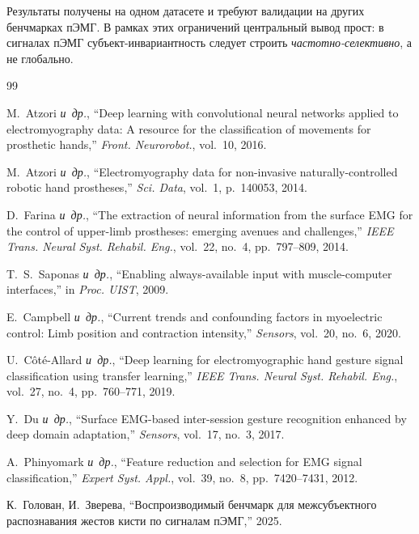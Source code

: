 \documentclass[conference]{IEEEtran}
\newcommand{\etal}{\mbox{\textit{и~др.}}}
\begin{document}
Результаты получены на одном датасете и требуют валидации на других бенчмарках пЭМГ.
В рамках этих ограничений центральный вывод прост: в сигналах пЭМГ субъект-инвариантность следует строить \emph{частотно-селективно}, а не глобально.


\begin{thebibliography}{99}

M.~Atzori \etal, ``Deep learning with convolutional neural networks applied to electromyography data: A resource for the classification of movements for prosthetic hands,'' \textit{Front. Neurorobot.}, vol.~10, 2016.

M.~Atzori \etal, ``Electromyography data for non-invasive naturally-controlled robotic hand prostheses,'' \textit{Sci. Data}, vol.~1, p.~140053, 2014.

D.~Farina \etal, ``The extraction of neural information from the surface EMG for the control of upper-limb prostheses: emerging avenues and challenges,'' \textit{IEEE Trans. Neural Syst. Rehabil. Eng.}, vol.~22, no.~4, pp.~797--809, 2014.

T.~S.~Saponas \etal, ``Enabling always-available input with muscle-computer interfaces,'' in \textit{Proc. UIST}, 2009.

E.~Campbell \etal, ``Current trends and confounding factors in myoelectric control: Limb position and contraction intensity,'' \textit{Sensors}, vol.~20, no.~6, 2020.

U.~C\^{o}t\'{e}-Allard \etal, ``Deep learning for electromyographic hand gesture signal classification using transfer learning,'' \textit{IEEE Trans. Neural Syst. Rehabil. Eng.}, vol.~27, no.~4, pp.~760--771, 2019.

Y.~Du \etal, ``Surface EMG-based inter-session gesture recognition enhanced by deep domain adaptation,'' \textit{Sensors}, vol.~17, no.~3, 2017.

A.~Phinyomark \etal, ``Feature reduction and selection for EMG signal classification,'' \textit{Expert Syst. Appl.}, vol.~39, no.~8, pp.~7420--7431, 2012.

К.~Голован, И.~Зверева, ``Воспроизводимый бенчмарк для межсубъектного распознавания жестов кисти по сигналам пЭМГ,'' 2025.


\end{thebibliography}
\end{document}
